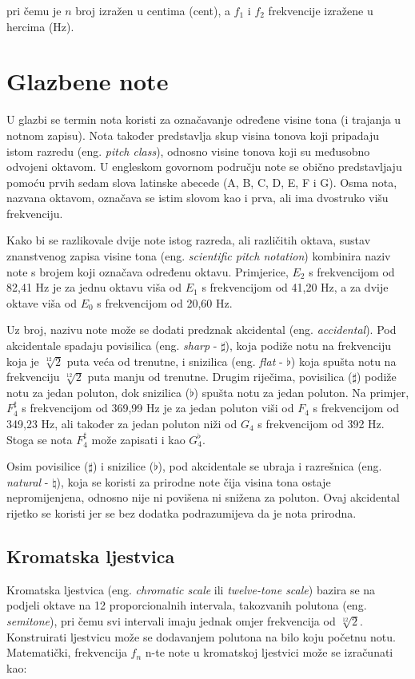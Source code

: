\documentclass[times, utf8, diplomski, numeric]{fer}
\begin{document}
pri čemu je $n$ broj izražen u centima (cent), a $f_1$ i $f_2$ frekvencije izražene u hercima (Hz).

\chapter{Glazbene note}
U glazbi se termin nota koristi za označavanje određene visine tona (i trajanja u notnom zapisu). Nota također predstavlja skup visina tonova koji pripadaju istom razredu (eng. \textit{pitch class}), odnosno visine tonova koji su međusobno odvojeni oktavom. U engleskom govornom području note se obično predstavljaju pomoću prvih sedam slova latinske abecede (A, B, C, D, E, F i G). Osma nota, nazvana oktavom, označava se istim slovom kao i prva, ali ima dvostruko višu frekvenciju.

Kako bi se razlikovale dvije note istog razreda, ali različitih oktava, sustav znanstvenog zapisa visine tona (eng. \textit{scientific pitch notation}) kombinira naziv note s brojem koji označava određenu oktavu.
Primjerice, $E_2$ s frekvencijom od 82,41 Hz je za jednu oktavu viša od $E_1$ s frekvencijom od 41,20 Hz, a za dvije oktave viša od $E_0$ s frekvencijom od 20,60 Hz.

Uz broj, nazivu note može se dodati predznak akcidental (eng. \textit{accidental}).\cite{pericic2008visejezicni} Pod akcidentale spadaju povisilica (eng. \textit{sharp} - $\sharp$), koja podiže notu na frekvenciju koja je $\sqrt[12]{2}$ puta veća od trenutne, i snizilica (eng. \textit{flat} - $\flat$) koja spušta notu na frekvenciju $\sqrt[12]{2}$ puta manju od trenutne. Drugim riječima, povisilica ($\sharp$) podiže notu za jedan poluton, dok snizilica ($\flat$) spušta notu za jedan poluton.\cite{hemu_2020}
Na primjer, $F_4^\sharp$ s frekvencijom od 369,99 Hz je za jedan poluton viši od $F_4$ s frekvencijom od 349,23 Hz, ali također za jedan poluton niži od $G_4$ s frekvencijom od 392 Hz. Stoga se nota $F_4^\sharp$ može zapisati i kao $G_4^\flat$.

Osim povisilice ($\sharp$) i snizilice ($\flat$), pod akcidentale se ubraja i razrešnica (eng. \textit{natural} - $\natural$), koja se koristi za prirodne note čija visina tona ostaje nepromijenjena, odnosno nije ni povišena ni snižena za poluton.\cite{benward2003introduction} Ovaj akcidental rijetko se koristi jer se bez dodatka podrazumijeva da je nota prirodna.

\section{Kromatska ljestvica}
Kromatska ljestvica (eng. \textit{chromatic scale} ili \textit{twelve-tone scale}) bazira se na podjeli oktave na 12 proporcionalnih intervala, takozvanih polutona (eng. \textit{semitone}), pri čemu svi intervali imaju jednak omjer frekvencija od $\sqrt[12]{2}$.\cite{sundberg1982tune} Konstruirati ljestvicu može se dodavanjem polutona na bilo koju početnu notu. Matematički, frekvencija $f_n$ n-te note u kromatskoj ljestvici može se izračunati kao:
\end{document}
